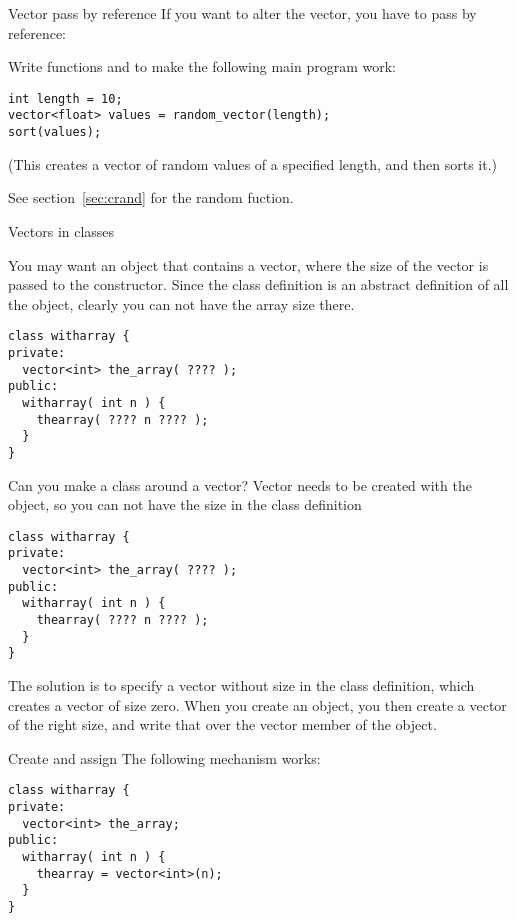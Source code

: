 \begin{block}{Vector pass by reference}
  \label{sl:vector-arg-ref}
  If you want to alter the vector, you have to pass by reference:
\end{block}

\begin{exercise}
  \label{ex:vec-rand-sort}
  Write functions  and  to make the following
  main program work:
\begin{verbatim}
int length = 10;
vector<float> values = random_vector(length);
sort(values);
\end{verbatim}
  (This creates a vector of random values of a specified length, and
then sorts it.)

See section~\ref{sec:crand} for the random fuction.
\end{exercise}

 {Vectors in classes}

You may want an object that contains a vector, where the size of the
vector is passed to the constructor. Since the class definition is an
abstract definition of all the object, clearly you can not have the
array size there.

\begin{verbatim}
class witharray {
private:
  vector<int> the_array( ???? );
public:
  witharray( int n ) {
    thearray( ???? n ???? );
  }
}
\end{verbatim}

\begin{slide}{Can you make a class around a vector?}
  \label{sl:class-with-vector}
  Vector needs to be created with the object, so you can not have the
  size in the class definition
\begin{verbatim}
class witharray {
private:
  vector<int> the_array( ???? );
public:
  witharray( int n ) {
    thearray( ???? n ???? );
  }
}
\end{verbatim}
\end{slide}

The solution is to specify a vector without size in the class
definition, which creates a vector of size zero. When you create an
object, you then create a vector of the right size, and write that
over the vector member of the object.

\begin{block}{Create and assign}
  \label{sl:class-has-vector}
  The following mechanism works:
\begin{verbatim}
class witharray {
private:
  vector<int> the_array;
public:
  witharray( int n ) {
    thearray = vector<int>(n);
  }
}
\end{verbatim}
\end{block}

